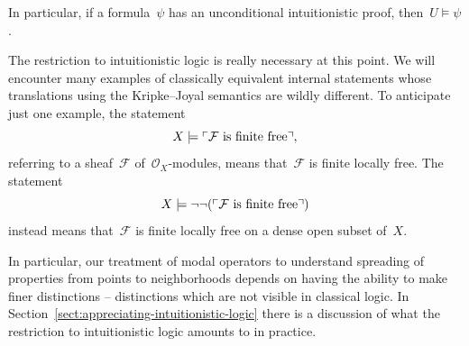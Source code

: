 \documentclass[10pt,reqno,a4paper]{amsbook}
\theoremstyle{definition}
\theoremstyle{plain}
\theoremstyle{remark}
\newcommand{\F}{\mathcal{F}}
\renewcommand{\O}{\mathcal{O}}
\newcommand{\?}{\,{:}\,}
\renewcommand{\_}{\mathpunct{.}\,}
\newcommand{\speak}[1]{\ulcorner\text{\textnormal{#1}}\urcorner}
\begin{document}
In particular, if a formula~$\psi$ has an unconditional intuitionistic proof,
then~$U \models \psi$.

The restriction to intuitionistic logic is really necessary at this point. We
will encounter many examples of classically equivalent internal statements whose
translations using the Kripke--Joyal semantics are wildly different. To
anticipate just one example, the statement
\[ X \models \speak{$\F$ is finite free}, \]
referring to a sheaf~$\F$ of~$\O_X$-modules, means that~$\F$ is finite locally
free. The statement
\[ X \models \neg\neg(\speak{$\F$ is finite free}) \]
instead means that~$\F$ is finite locally free on a dense open subset of~$X$.

In
particular, our treatment of modal operators to understand spreading of
properties from points to neighborhoods depends on having the ability to make
finer distinctions -- distinctions which are not visible in classical logic.
In Section~\ref{sect:appreciating-intuitionistic-logic} there is a discussion of what the restriction to
intuitionistic logic amounts to in practice.
\end{document}
